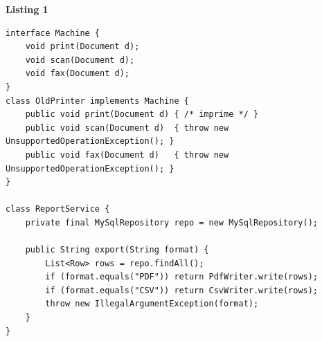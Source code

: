 \documentclass[border=10pt]{standalone}
\begin{document}
\pagecolor{paper}\begin{minipage}{16.5cm}\vspace{4pt}
\textbf{\small\color{gray}Listing 1}\par\vspace{2pt}
\lstset{style=sv}
\begin{lstlisting}
interface Machine {
    void print(Document d);
    void scan(Document d);
    void fax(Document d);
}
class OldPrinter implements Machine {
    public void print(Document d) { /* imprime */ }
    public void scan(Document d)  { throw new UnsupportedOperationException(); }
    public void fax(Document d)   { throw new UnsupportedOperationException(); }
}

class ReportService {
    private final MySqlRepository repo = new MySqlRepository();

    public String export(String format) {
        List<Row> rows = repo.findAll();
        if (format.equals("PDF")) return PdfWriter.write(rows);
        if (format.equals("CSV")) return CsvWriter.write(rows);
        throw new IllegalArgumentException(format);
    }
}
\end{lstlisting}
\vspace{2pt}\end{minipage}
\end{document}
